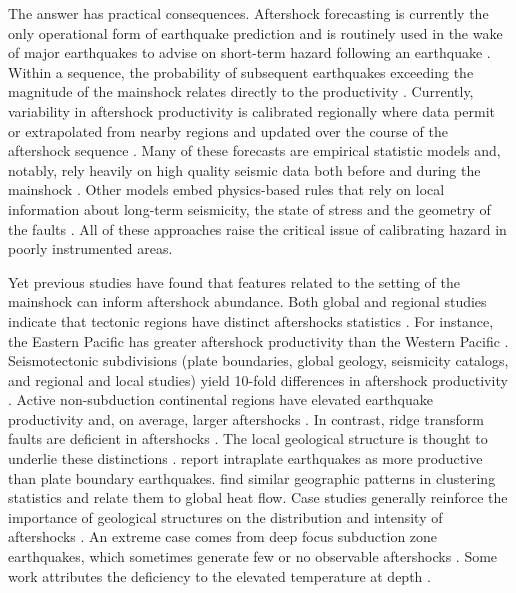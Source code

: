 \documentclass[draft, jgrga]{agujournal2018}
\begin{document}
The answer has practical consequences. Aftershock forecasting is currently the only operational form of earthquake prediction and is routinely used in the wake of major earthquakes to advise on short-term hazard following an earthquake \citep{Reasenberg1989, Page,Hardebeck2018UpdatedParameters}. Within a sequence, the probability of subsequent earthquakes exceeding the magnitude of the mainshock relates directly to the productivity \citep{Reasenberg1989, Reasenberg1999ForeshockEarthquakes}. Currently, variability in aftershock productivity is calibrated regionally where data permit or extrapolated from nearby regions and updated over the course of the aftershock sequence \citep[e.g.][]{Reasenberg1989, Reasenberg1999ForeshockEarthquakes, ogata2017statistics}. Many of these forecasts are empirical statistic models and, notably, rely heavily on high quality seismic data both before and during the mainshock \citep{Gerstenberger2005Real-timeCalifornia, Omi2015Intermediate-termApproaches}. Other models embed physics-based rules that rely on local information about long-term seismicity, the state of stress and the geometry of the faults \citep[e.g.][]{Segou2016ProspectiveMainshock, Field2017AForecast}. All of these approaches raise the critical issue of calibrating hazard in poorly instrumented areas.

Yet previous studies have found that features related to the setting of the mainshock can inform aftershock abundance. Both global and regional studies indicate that tectonic regions have distinct aftershocks statistics \citep{Chu2011, Page, Davidsen2015GeneralizedCalifornia, Tahir2014Aftershock2005, ogata2017statistics}. For instance, the Eastern Pacific has greater aftershock productivity than the Western Pacific \citep{Singh1911, Wetzler2016}. Seismotectonic subdivisions (plate boundaries, global geology, seismicity catalogs, and regional and local studies) yield 10-fold differences in aftershock productivity \citep{Page}. Active non-subduction continental regions have elevated earthquake productivity and, on average, larger aftershocks \citep{Page, Mogi1967, Davis1991Single-linkVariations}. In contrast, ridge transform faults are deficient in aftershocks \citep{Davis1991Single-linkVariations, Boettcher2004EarthquakeFaults, McGuire2005}. The local geological structure is thought to underlie these distinctions \citep{Boettcher2004EarthquakeFaults, McCloskey2003StructuralAftershocks}. \citet{Yamanaka1990scalingshock} report intraplate earthquakes as more productive than plate boundary earthquakes. \citet{Zaliapin2016AClusters} find similar geographic patterns in clustering statistics and relate them to global heat flow. Case studies generally reinforce the importance of geological structures on the distribution and intensity of aftershocks \citep{Das2003SpatialDistribution, McCloskey2003StructuralAftershocks}. An extreme case comes from deep focus subduction zone earthquakes, which sometimes generate few or no observable aftershocks \citep{Bath1965LateralMantle, Frohlich1989TheEarthquakes, Nyffenegger2000, Wiens1997AftershockZone, Wu1999, Houston2004}. Some work attributes the deficiency to the elevated temperature at depth \citep{Nyffenegger2000, Houston2004}. 
\end{document}
